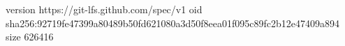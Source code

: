 version https://git-lfs.github.com/spec/v1
oid sha256:92719fe47399a80489b50fd621080a3d50f8eea01f095c89fc2b12e47409a894
size 626416
